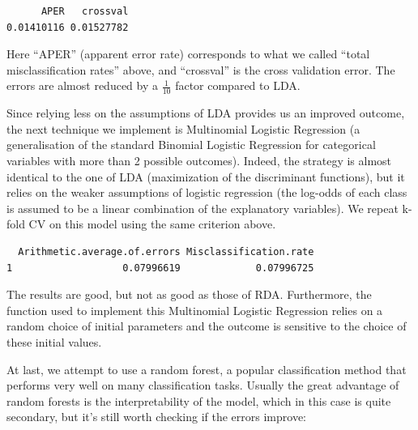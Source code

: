 \documentclass[
  letterpaper,
  DIV=11,
  numbers=noendperiod]{scrartcl}
\newenvironment{Shaded}{\begin{snugshade}}{\end{snugshade}}
\newcommand{\AttributeTok}[1]{\textcolor[rgb]{0.40,0.45,0.13}{#1}}
\newcommand{\ConstantTok}[1]{\textcolor[rgb]{0.56,0.35,0.01}{#1}}
\newcommand{\DecValTok}[1]{\textcolor[rgb]{0.68,0.00,0.00}{#1}}
\newcommand{\FunctionTok}[1]{\textcolor[rgb]{0.28,0.35,0.67}{#1}}
\newcommand{\NormalTok}[1]{\textcolor[rgb]{0.00,0.23,0.31}{#1}}
\newcommand{\OtherTok}[1]{\textcolor[rgb]{0.00,0.23,0.31}{#1}}
\newcommand{\SpecialCharTok}[1]{\textcolor[rgb]{0.37,0.37,0.37}{#1}}
\begin{document}
\begin{Shaded}
\end{Shaded}

\begin{verbatim}
      APER   crossval 
0.01410116 0.01527782 
\end{verbatim}

Here ``APER'' (apparent error rate) corresponds to what we called
``total misclassification rates'' above, and ``crossval'' is the cross
validation error. The errors are almost reduced by a \(\frac{1}{10}\)
factor compared to LDA.

Since relying less on the assumptions of LDA provides us an improved
outcome, the next technique we implement is Multinomial Logistic
Regression (a generalisation of the standard Binomial Logistic
Regression for categorical variables with more than 2 possible
outcomes). Indeed, the strategy is almost identical to the one of LDA
(maximization of the discriminant functions), but it relies on the
weaker assumptions of logistic regression (the log-odds of each class is
assumed to be a linear combination of the explanatory variables). We
repeat k-fold CV on this model using the same criterion above.

\begin{verbatim}
  Arithmetic.average.of.errors Misclassification.rate
1                   0.07996619             0.07996725
\end{verbatim}

The results are good, but not as good as those of RDA. Furthermore, the
function used to implement this Multinomial Logistic Regression relies
on a random choice of initial parameters and the outcome is sensitive to
the choice of these initial values.

At last, we attempt to use a random forest, a popular classification
method that performs very well on many classification tasks. Usually the
great advantage of random forests is the interpretability of the model,
which in this case is quite secondary, but it's still worth checking if
the errors improve:
\end{document}
